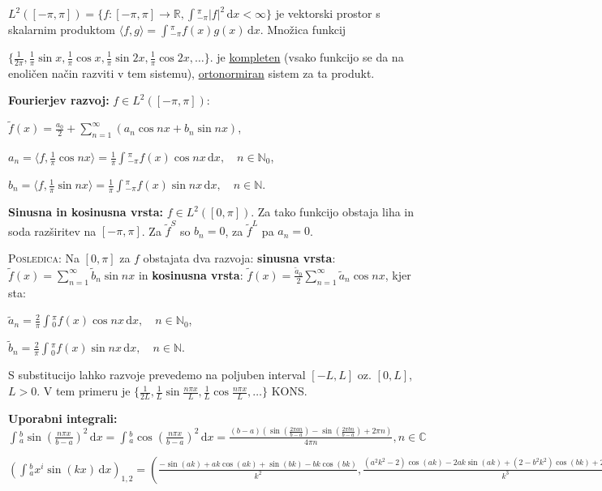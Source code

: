 \documentclass[10pt,a4paper]{amsart}
\theoremstyle{definition} %
\theoremstyle{plain} %
\newcommand{\dx}{\ensuremath{\,\mathrm{d}x}}
\let\oldint\int
\renewcommand{\int}{\oldint \!}
\newcommand{\R}{\mathbb R}
\newcommand{\N}{\mathbb N}
\newcommand{\C}{\mathbb C}
\begin{document}
$L^2([-\pi,\pi]) = \{f:[-\pi,\pi]\longrightarrow \R, \int_{-\pi}^\pi |f|^2
\dx < \infty \}$ je vektorski prostor s skalarnim produktom $\langle f, g\rangle =
\int_{-\pi}^\pi f(x)g(x)\dx$. Množica funkcij

  $\{\frac{1}{2\pi},
  \frac{1}{\pi}\sin{x},\frac{1}{\pi}\cos{x},\frac{1}{\pi}\sin{2x},\frac{1}{\pi}\cos{2x},\ldots
\}$. je \underline{kompleten} (vsako funkcijo se da na enoličen način razviti v
tem sistemu),  \underline{ortonormiran} sistem za ta produkt.

\textbf{Fourierjev razvoj:} $f \in L^2([-\pi,\pi])$:

$\tilde{f}(x) = \frac{a_0}{2} + \sum_{n=1}^{\infty}(a_n\cos{nx} + b_n\sin{nx})$,

$a_n = \langle f,\frac{1}{\pi}\cos{nx} \rangle =
\frac{1}{\pi}\int_{-\pi}^{\pi}f(x)\cos{nx}\dx, \quad n \in \N_0$,

$b_n = \langle f,\frac{1}{\pi}\sin{nx} \rangle =
\frac{1}{\pi}\int_{-\pi}^{\pi}f(x)\sin{nx}\dx, \quad n \in \N$.

\textbf{Sinusna in kosinusna vrsta:} $f \in L^2([0,\pi])$. Za tako funkcijo
obstaja liha in soda razširitev na $[-\pi,\pi]$. Za $\tilde{f}^S$ so $b_n = 0$,
za $\tilde{f}^L$ pa $a_n = 0$.

\textsc{Posledica:} Na $[0,\pi]$ za $f$ obstajata dva razvoja: \textbf{sinusna
vrsta}: $\tilde{f}(x) =  \sum_{n=1}^{\infty} \tilde{b}_n\sin{nx}$ in
\textbf{kosinusna vrsta}:  $\tilde{f}(x) =
\frac{\tilde{a}_0}{2}\sum_{n=1}^{\infty}\tilde{a}_n\cos{nx}$, kjer sta:

$\tilde{a}_n = \frac{2}{\pi}\int_0^{\pi}f(x)\cos{nx}\dx, \quad n \in \N_0$,

$\tilde{b}_n = \frac{2}{\pi}\int_0^{\pi}f(x)\sin{nx}\dx, \quad n \in \N$.

S substitucijo lahko razvoje prevedemo na poljuben interval $[-L,L]$ oz.
$[0,L]$, $L > 0$. V tem primeru je $\{\frac{1}{2L}, \frac{1}{L}\sin{\frac{n\pi
x}{L}},\frac{1}{L}\cos{\frac{n\pi x}{L}},\ldots \}$ KONS.

\textbf{Uporabni integrali:}
$\int_a^b \sin(\frac{n\pi x}{b-a})^2 \dx = \int_a^b \cos(\frac{n\pi x}{b-a})^2 \dx =
\frac{(b-a) \left(\sin \left(\frac{2 \pi  a n}{b-a}\right)-\sin \left(\frac{2
\pi  b n}{b-a}\right)+2 \pi  n\right)}{4 \pi  n}, n \in \C$

$(\int_a^bx^i \sin(kx)\dx)_{1,2} = (\frac{-\sin (a k)+a k \cos (a k)+\sin (b k)-b k \cos (b k)}{k^2},\frac{(a^2 k^2-2) \cos (a k)-2 a k \sin (a k)+(2-b^2 k^2) \cos (b k)+2 b k \sin (b k)}{k^3})$
\end{document}
